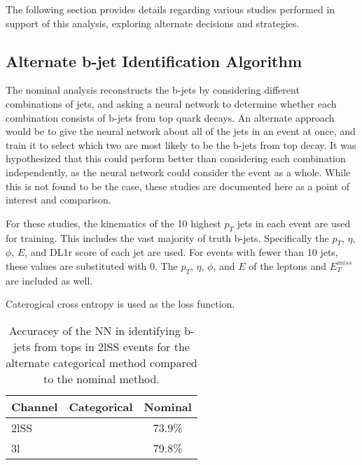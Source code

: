 
The following section provides details regarding various studies performed in support of this analysis, exploring alternate decisions and strategies. 

\subsection{Alternate b-jet Identification Algorithm}
\label{subsec:topRecoApx}

The nominal analysis reconstructs the b-jets by considering different combinations of jets, and asking a neural network to determine whether each combination consists of b-jets from top quark decays. An alternate approach would be to give the neural network about all of the jets in an event at once, and train it to select which two are most likely to be the b-jets from top decay. It was hypothesized that this could perform better than considering each combination independently, as the neural network could consider the event as a whole. While this is not found to be the case, these studies are documented here as a point of interest and comparison.

For these studies, the kinematics of the 10 highest $p_T$ jets in each event are used for training. This includes the vast majority of truth b-jets. Specifically the $p_T$, $\eta$, $\phi$, $E$, and DL1r score of each jet are used. For events with fewer than 10 jets, these values are substituted with 0. The $p_T$, $\eta$, $\phi$, and $E$ of the leptons and $E_T^{miss}$ are included as well. 

Caterogical cross entropy is used as the loss function.

\begin{table}[h!]
  \centering
  \caption{Accuracey of the NN in identifying b-jets from tops in 2lSS events for the alternate categorical method compared to the nominal method.}
  \begin{tabular}{l|c|c}                                                                                                     
  \hline\hline
  Channel & Categorical & Nominal \\                                                                              
  \hline                                                                                                                  
  2lSS & & 73.9\% \\
  3l & & 79.8\% \\
  \hline                                                                                                                 
  \end{tabular}                                                                                                           
  \label{tab:topMatchCatApx}
\end{table}

